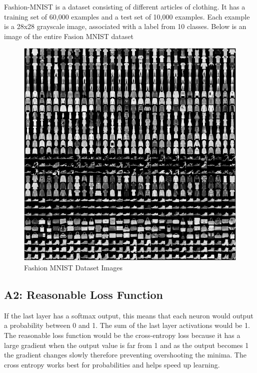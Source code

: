 \documentclass[a4paper, 12pt]{article}
\begin{document}
    Fashion-MNIST is a dataset consisting of different articles of clothing. It has a training set of 60,000 examples and a test set of 10,000 examples. Each example is a 28x28 grayscale image, associated with a label from 10 classes. Below is an image of the entire Fasion MNIST dataset

    \begin{figure}[h!]
        \centering
        \captionsetup{justification=centering}
        \includegraphics[scale = 0.37]{2.png}
        \caption{Fashion MNIST Dataset Images}
    \end{figure}

    \subsection{A2: Reasonable Loss Function}

    If the last layer has a softmax output, this means that each neuron would output a probability between 0 and 1. The sum of the last layer activations would be 1. The reasonable loss function would be the cross-entropy loss because it has a large gradient when the output value is far from 1 and as the output becomes 1 the gradient changes slowly therefore preventing overshooting the minima. The cross entropy works best for probabilities and helps speed up learning.
\end{document}
